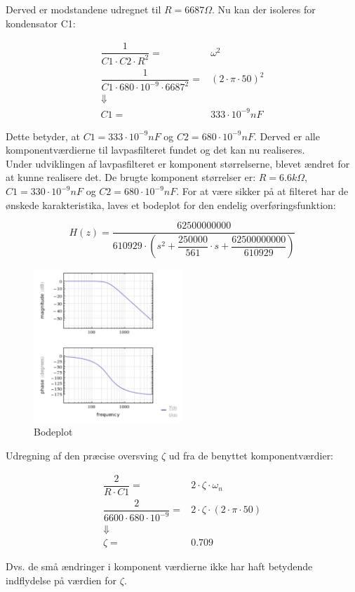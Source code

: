 Derved er modstandene udregnet til $ R = 6687\Omega $. Nu kan der isoleres for kondensator C1:
\begin{ceqn} 
\begin{equation}
\begin{split}
\dfrac{1}{C1\cdot C2\cdot R^2}=& \omega^2\\
\dfrac{1}{C1\cdot 680\cdot 10^{-9}\cdot 6687^2}=& (2\cdot \pi \cdot 50)^2\\
\Downarrow\\
C1= &333\cdot 10^{-9} nF
\end{split}
\end{equation}
\end{ceqn}
Dette betyder, at $ C1 = 333\cdot 10^{-9} nF $  og  $ C2 = 680\cdot 10^{-9} nF$. Derved er alle komponentværdierne til lavpasfilteret fundet og det kan nu realiseres. \\ 
\newline
Under udviklingen af lavpasfilteret er komponent størrelserne, blevet ændret for at kunne realisere det. De brugte komponent størrelser er: $ R= 6.6 k\Omega $, $ C1= 330\cdot 10 ^{-9} nF$ og $ C2= 680\cdot 10^{-9} nF$.   
For at være sikker på at filteret har de ønskede karakteristika, laves et bodeplot for den endelig overføringsfunktion:
\begin{ceqn}
\begin{equation}
H(z)=\dfrac{62500000000}{610929\cdot \left( s^2+\dfrac{250000}{561}\cdot s + \dfrac{62500000000}{610929} \right)}
\end{equation}
\end{ceqn}
\begin{figure}[H]
	\centering
	\includegraphics[width=0.5\textwidth]{Figurer/Bodeplot}
	\caption{Bodeplot}
	\label{fig:bodeplot}
\end{figure}
Udregning af den præcise oversving $ \zeta $ ud fra de benyttet komponentværdier:
\begin{ceqn} 
\begin{equation}
\begin{split}
\dfrac{2}{R\cdot C1}=& 2\cdot \zeta\cdot \omega_n\\
\dfrac{2}{6600\cdot 680\cdot 10^{-9}}=& 2\cdot \zeta\cdot (2\cdot \pi \cdot 50)\\
\Downarrow\\
\zeta =& 0.709
\end{split}
\end{equation}
\end{ceqn}
Dvs. de små ændringer i komponent værdierne ikke har haft betydende indflydelse på værdien for $ \zeta $. 


